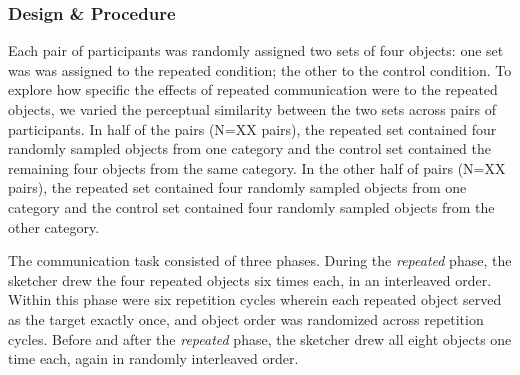 \documentclass[10pt,letterpaper]{article}
\begin{document}


\subsubsection{Design \& Procedure} 

Each pair of participants was randomly assigned two sets of four objects: one set was was assigned to the repeated condition; the other to the control condition.
To explore how specific the effects of repeated communication were to the repeated objects, we varied the perceptual similarity between the two sets across pairs of participants. 
In half of the pairs (N=XX pairs), the repeated set contained four randomly sampled objects from one category and the control set contained the remaining four objects from the same category. 
In the other half of pairs (N=XX pairs), the repeated set contained four randomly sampled objects from one category and the control set contained four randomly sampled objects from the other category.


The communication task consisted of three phases. 
During the \textit{repeated} phase, the sketcher drew the four repeated objects six times each, in an interleaved order.
Within this phase were six repetition cycles wherein each repeated object served as the target exactly once, and object order was randomized across repetition cycles. 
Before and after the \textit{repeated} phase, the sketcher drew all eight objects one time each, again in randomly interleaved order. 

\end{document}
